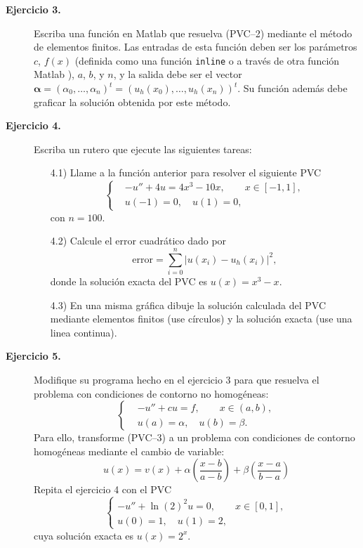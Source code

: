 \documentclass[letterpaper,11pt]{article}
\newcommand{\matlab}{{\sc Matlab} }
\begin{document}
\begin{description}
\item[\textbf{Ejercicio 3.}] Escriba una funci\'on en \matlab{} que resuelva (PVC--2) mediante el m\'etodo de elementos finitos. Las entradas de esta funci\'on deben ser los par\'ametros $c$, $f(x)$ (definida como una funci\'on \verb"inline" o a trav\'es de otra funci\'on \matlab), $a$, $b$, y $n$, y la salida debe ser el vector $\boldsymbol{\alpha}=(\alpha_0,\ldots,\alpha_n)^t=(u_h(x_0),\ldots,u_h(x_n))^t$. Su funci\'on adem\'as debe graficar la soluci\'on obtenida por este m\'etodo.\medskip

\item[\textbf{Ejercicio 4.}]
Escriba un rutero que ejecute las siguientes tareas:
\begin{itemize}
\item[4.1)] Llame a la funci\'on anterior para resolver el siguiente PVC
$$
\left\{
\begin{aligned}
& -u''+4u=4x^3-10x,\qquad x\in[-1,1],\\
& u(-1)=0,\quad u(1)=0,
\end{aligned}
\right.
$$
con $n=100$.
\item[4.2)] Calcule el error cuadr\'atico dado por
$$
\text{error}=\sum_{i=0}^{n}|u(x_i)-u_h(x_i)|^2,
$$
donde la soluci\'on exacta del PVC es $u(x)=x^3-x$.
\item[4.3)] En una misma gr\'afica dibuje la soluci\'on calculada del PVC mediante elementos finitos (use c\'irculos) y la soluci\'on exacta (use una linea continua).
\end{itemize}
\item[\textbf{Ejercicio 5.}] Modifique su programa hecho en el ejercicio 3 para que resuelva el problema con condiciones de contorno no homog\'eneas:
\begin{equation}\tag{PVC--3}
\left\{
\begin{aligned}
& -u''+cu=f, \qquad x\in(a,b),\\
& u(a)=\alpha,\quad u(b)=\beta.
\end{aligned}
\right.
\end{equation}
Para ello, transforme (PVC--3) a un problema con condiciones de contorno homog\'eneas mediante el cambio de variable:
$$
u(x)=v(x)+\alpha\left(\dfrac{x-b}{a-b}\right)+\beta\left(\dfrac{x-a}{b-a}\right)
$$
Repita el ejercicio 4 con el PVC
$$
\left\{
\begin{array}{l}
-u''+\ln(2)^2u=0,\qquad x\in[0,1],\\
u(0)=1,\quad u(1)=2,
\end{array}
\right.
$$
cuya soluci\'on exacta es $u(x)=2^x$.


\end{description}
\end{document}
